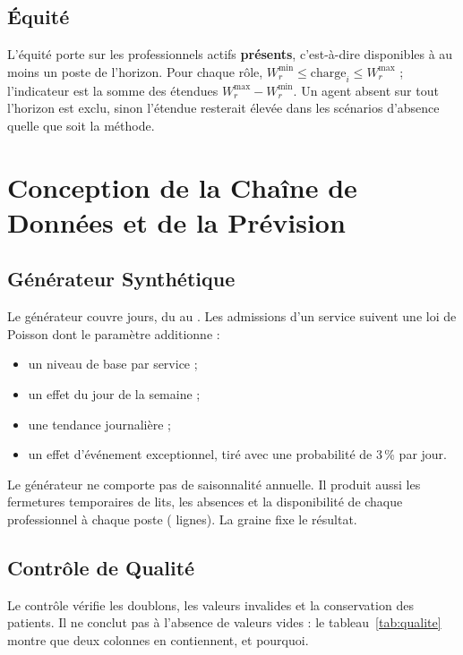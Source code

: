 \subsection{Équité}
L'équité porte sur les professionnels actifs \textbf{présents}, c'est-à-dire disponibles à au moins un poste de l'horizon. Pour chaque rôle, $W^{\min}_r \le \text{charge}_i \le W^{\max}_r$ ; l'indicateur est la somme des étendues $W^{\max}_r - W^{\min}_r$. Un agent absent sur tout l'horizon est exclu, sinon l'étendue resterait élevée dans les scénarios d'absence quelle que soit la méthode.

\section{Conception de la Chaîne de Données et de la Prévision}

\subsection{Générateur Synthétique}
Le générateur couvre \NbJours{} jours, du \DateDebut{} au \DateFin{}. Les admissions d'un service suivent une loi de Poisson dont le paramètre additionne :
\begin{itemize}
    \item un niveau de base par service ;
    \item un effet du jour de la semaine ;
    \item une tendance journalière ;
    \item un effet d'événement exceptionnel, tiré avec une probabilité de 3\,\% par jour.
\end{itemize}

Le générateur ne comporte pas de saisonnalité annuelle. Il produit aussi les fermetures temporaires de lits, les absences et la disponibilité de chaque professionnel à chaque poste (\LignesDispo{} lignes). La graine fixe le résultat.

\subsection{Contrôle de Qualité}
Le contrôle vérifie les doublons, les valeurs invalides et la conservation des patients. Il ne conclut pas à l'absence de valeurs vides : le tableau~\ref{tab:qualite} montre que deux colonnes en contiennent, et pourquoi.

